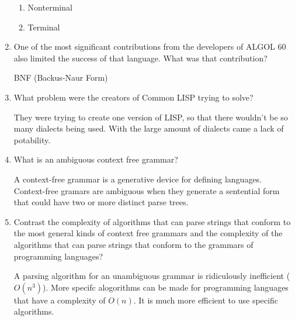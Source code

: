 \begin{enumerate}
\begin{answer}
  \begin{enumerate}
    \item Nonterminal
    \item Terminal
    \end{enumerate}

    \end{answer}


  \item One of the most significant contributions from the developers
    of ALGOL 60 also limited the success of that language. What was
    that contribution?

  \begin{answer}

    BNF (Backus-Naur Form)

    \end{answer}

  \item What problem were the creators of Common LISP trying to solve?

  \begin{answer}

    They were trying to create one version of LISP, so that there
    wouldn't be so many dialects being used.  With the large amount of
    dialects came a lack of potability.

    \end{answer}

  \item What is an ambiguous context free grammar?

  \begin{answer}

    A context-free grammar is a generative device for defining
    languages. Context-free gramars are ambiguous when they generate a
    sentential form that could have two or more distinct parse trees.

    \end{answer}

  \item Contrast the complexity of algorithms that can parse strings
    that conform to the most general kinds of context free grammars
    and the complexity of the algorithms that can parse strings that
    conform to the grammars of programming languages?

  \begin{answer}

    A parsing algorithm for an unambiguous grammar is ridiculously
    inefficient ($O(n^3)$).  More specifc alogorithms can be made for
    programming languages that have a complexity of $O(n)$.  It is much
    more efficient to use specific algorithms.


\end{answer}
\end{enumerate}
